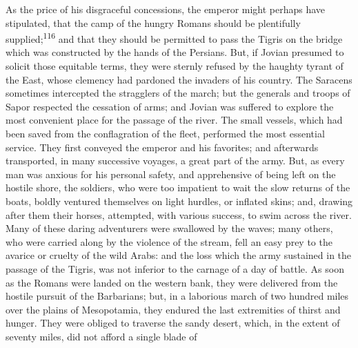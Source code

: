 

As the price of his disgraceful concessions, the emperor might
perhaps have stipulated, that the camp of the hungry Romans
should be plentifully supplied;\textsuperscript{116} and that they should be
permitted to pass the Tigris on the bridge which was constructed
by the hands of the Persians. But, if Jovian presumed to solicit
those equitable terms, they were sternly refused by the haughty
tyrant of the East, whose clemency had pardoned the invaders of
his country. The Saracens sometimes intercepted the stragglers of
the march; but the generals and troops of Sapor respected the
cessation of arms; and Jovian was suffered to explore the most
convenient place for the passage of the river. The small vessels,
which had been saved from the conflagration of the fleet,
performed the most essential service. They first conveyed the
emperor and his favorites; and afterwards transported, in many
successive voyages, a great part of the army. But, as every man
was anxious for his personal safety, and apprehensive of being
left on the hostile shore, the soldiers, who were too impatient
to wait the slow returns of the boats, boldly ventured themselves
on light hurdles, or inflated skins; and, drawing after them
their horses, attempted, with various success, to swim across the
river. Many of these daring adventurers were swallowed by the
waves; many others, who were carried along by the violence of the
stream, fell an easy prey to the avarice or cruelty of the wild
Arabs: and the loss which the army sustained in the passage of
the Tigris, was not inferior to the carnage of a day of battle.
As soon as the Romans were landed on the western bank, they were
delivered from the hostile pursuit of the Barbarians; but, in a
laborious march of two hundred miles over the plains of
Mesopotamia, they endured the last extremities of thirst and
hunger. They were obliged to traverse the sandy desert, which, in
the extent of seventy miles, did not afford a single blade of
